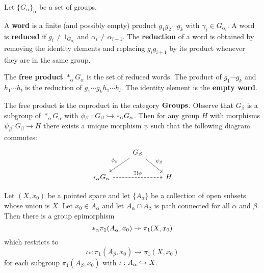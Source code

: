\begin{defn}
	Let $\{G_\alpha\}_{\alpha}$ be a set of groups.
	\begin{itm}
		\io A \textbf{word} is a finite (and possibly empty) product $g_1g_2\cdots g_k$ with $\gamma_i \in G_{\alpha_i}$.
		\io A word is \textbf{reduced} if $g_i \neq 1_{G_{\alpha_i}}$ and $\alpha_i \neq \alpha_{i+1}$.
		\io The \textbf{reduction} of a word is obtained by removing the identity elements and replacing $g_ig_{i+1}$ by its product whenever they are in the same group.
	\end{itm}
	The \textbf{free product} $*_\alpha G_\alpha$ is the set of reduced words.
	The product of $g_1\cdots g_k$ and $h_1 \cdots h_l$ is the reduction of $g_1\cdots g_kh_1 \cdots h_l$.
	The identity element is the \textbf{empty word}.
\end{defn}

\begin{prop}
	The free product is the coproduct in the category $\mathbf{Groups}$.
	Observe that $G_\beta$ is a subgroup of $*_\alpha G_\alpha$ with $\phi_\beta: G_\beta \hookrightarrow *_\alpha G_\alpha$.
	Then for any group $H$ with morphisms $\psi_\beta: G_\beta \to H$ there exists a unique morphism $\psi$ such that the following diagram commutes:
	\[
	\begin{tikzcd}
		& G_\beta \ar[ld, swap, "\phi_\beta"] \ar[rd, "\psi_\beta"] & \\
		*_\alpha G_\alpha \ar[rr, dashed, "\exists ! \psi"] & & H
	\end{tikzcd}
	\]
\end{prop}

\begin{lem}
	Let $(X,x_0)$ be a pointed space and let $\{A_\alpha\}$ be a collection of open subsets whose union is $X$.
	Let $x_0 \in A_\alpha$ and let $A_\alpha \cap A_\beta$ is path connected for all $\alpha$ and $\beta$.
	Then there is a group epimorphism
	\[*_\alpha \pi_1(A_\alpha,x_0) \twoheadrightarrow \pi_1(X,x_0)\]
	which restricts to
	\[\iota_*: \pi_1(A_\beta,x_0) \to \pi_1(X,x_0)\]
	for each subgroup $\pi_1(A_\beta, x_0)$ with $\iota:A_\alpha \hookrightarrow X$.
\end{lem}